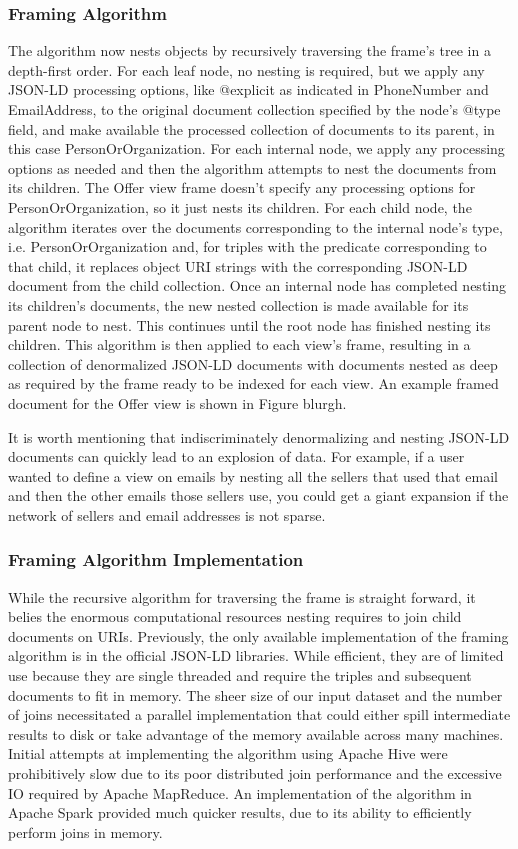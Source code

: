 \subsubsection{Framing Algorithm}
The algorithm now nests objects by recursively traversing the frame's tree in a depth-first order.  
For each leaf node, no nesting is required, but we apply any JSON-LD processing options, like @explicit as indicated in PhoneNumber and EmailAddress, to the original document collection specified by the node's @type field, and make available the processed collection of documents to its parent, in this case PersonOrOrganization.  
For each internal node, we apply any processing options as needed and then the algorithm attempts to nest the documents from its children.  
The Offer view frame doesn't specify any processing options for PersonOrOrganization, so it just nests its children.
For each child node, the algorithm iterates over the documents corresponding to the internal node's type, i.e. PersonOrOrganization and, for triples with the predicate corresponding to that child, it replaces object URI strings with the corresponding JSON-LD document from the child collection.  
Once an internal node has completed nesting its children's documents, the new nested collection is made available for its parent node to nest.
This continues until the root node has finished nesting its children.
This algorithm is then applied to each view's frame, resulting in a collection of denormalized JSON-LD documents with documents nested as deep as required by the frame ready to be indexed for each view.
An example framed document for the Offer view is shown in Figure blurgh.

It is worth mentioning that indiscriminately denormalizing and nesting JSON-LD documents can quickly lead to an explosion of data.  For example, if a user wanted to define a view on emails by nesting all the sellers that used that email and then the other emails those sellers use, you could get a giant expansion if the network of sellers and email addresses is not sparse.    

\subsubsection{Framing Algorithm Implementation}
While the recursive algorithm for traversing the frame is straight forward, it belies the enormous computational resources nesting requires to join child documents on URIs.
Previously, the only available implementation of the framing algorithm is in the official JSON-LD libraries.  %
While efficient, they are of limited use because they are single threaded and require the triples and subsequent documents to fit in memory.
The sheer size of our input dataset and the number of joins necessitated a parallel implementation that could either spill intermediate results to disk or take advantage of the memory available across many machines. 
Initial attempts at implementing the algorithm using Apache Hive were prohibitively slow due to its poor distributed join performance and the excessive IO required by Apache MapReduce.  
An implementation of the algorithm in Apache Spark provided much quicker results, due to its ability to efficiently perform joins in memory.   

